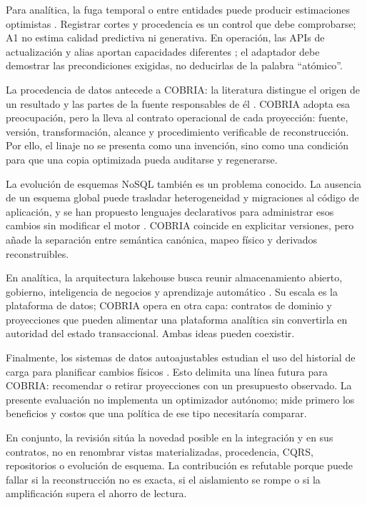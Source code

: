 Para analítica, la fuga temporal o entre entidades puede producir estimaciones
optimistas \parencite{kapoor2023leakage}. Registrar cortes y procedencia es un control
que debe comprobarse; A1 no estima calidad predictiva ni generativa. En operación,
las APIs de actualización y alias aportan capacidades diferentes
\parencite{mongodbAtomicity,apacheCouchDocumentApi,opensearch32Alias}; el adaptador
debe demostrar las precondiciones exigidas, no deducirlas de la palabra ``atómico''.

La procedencia de datos antecede a COBRIA: la literatura distingue el origen de un
resultado y las partes de la fuente responsables de él \parencite{buneman2001provenance}.
COBRIA adopta esa preocupación, pero la lleva al contrato operacional de cada proyección:
fuente, versión, transformación, alcance y procedimiento verificable de reconstrucción.
Por ello, el linaje no se presenta como una invención, sino como una condición para que
una copia optimizada pueda auditarse y regenerarse.

La evolución de esquemas NoSQL también es un problema conocido. La ausencia de un
esquema global puede trasladar heterogeneidad y migraciones al código de aplicación, y
se han propuesto lenguajes declarativos para administrar esos cambios sin modificar el
motor \parencite{scherzinger2013schema}. COBRIA coincide en explicitar versiones, pero
añade la separación entre semántica canónica, mapeo físico y derivados reconstruibles.

En analítica, la arquitectura lakehouse busca reunir almacenamiento abierto, gobierno,
inteligencia de negocios y aprendizaje automático \parencite{armbrust2021lakehouse}.
Su escala es la plataforma de datos; COBRIA opera en otra capa: contratos de dominio y
proyecciones que pueden alimentar una plataforma analítica sin convertirla en autoridad
del estado transaccional. Ambas ideas pueden coexistir.

Finalmente, los sistemas de datos autoajustables estudian el uso del historial de carga
para planificar cambios físicos \parencite{pavlo2017selfdriving}. Esto delimita una línea
futura para COBRIA: recomendar o retirar proyecciones con un presupuesto observado. La
presente evaluación no implementa un optimizador autónomo; mide primero los beneficios y
costos que una política de ese tipo necesitaría comparar.

En conjunto, la revisión sitúa la novedad posible en la integración y en sus contratos,
no en renombrar vistas materializadas, procedencia, CQRS, repositorios o evolución de
esquema. La contribución es refutable porque puede fallar si la reconstrucción no es
exacta, si el aislamiento se rompe o si la amplificación supera el ahorro de lectura.

